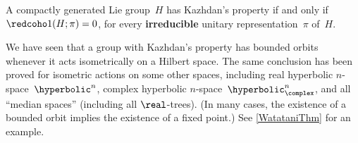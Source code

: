 \begin{cor} \label{T<>H1irred=0}
A compactly generated Lie group~$H$ has Kazhdan's property if and only if\/
 $\redcoho1(H; \pi) = 0$, for every \textbf{irreducible} unitary representation~$\pi$ of~$H$.
\end{cor}

\begin{rem} \label{T->FPonOther}
We have seen that a group with Kazhdan's property has bounded orbits whenever it acts isometrically on a Hilbert space. The same conclusion has been proved for isometric actions on some other spaces, including real hyperbolic $n$-space~$\hyperbolic^n$, complex hyperbolic $n$-space~$\hyperbolic_{\complex}^n$, and all ``median spaces'' (including all $\real$-trees). (In many cases, the existence of a bounded orbit implies the existence of a fixed point.)
See \cref{WatataniThm} for an example.
\end{rem}

